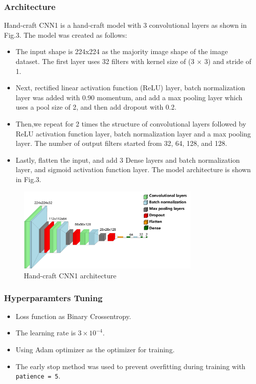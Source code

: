 \documentclass[conference]{IEEEtran}
\begin{document}
\subsubsection{Architecture}
Hand-craft CNN1 is a hand-craft model with 3 convolutional layers as shown in Fig.3. The model was created as follows:
\begin{itemize}
    \item The input shape is 224x224 as the majority image shape of the image dataset. The first layer uses 32 filters with kernel size of (3 × 3) and stride of 1.
    \item Next, rectified linear activation function (ReLU) layer, batch normalization layer was added with 0.90 momentum, and add a max pooling layer which uses a pool size of 2, and then add dropout with 0.2.
    \item Then,we repeat for 2 times the structure of convolutional layers followed by ReLU activation function layer, batch normalization layer and a max pooling layer. The number of output filters started from 32, 64, 128, and 128. 
    \item Lastly, flatten the input, and add 3 Dense layers and batch normalization layer, and sigmoid activation function layer.
    The model architecture is shown in Fig.3.
    
\end{itemize}

\begin{figure}[ht!] %
\centering
\includegraphics[width=3.5in]{CNN1.pdf}
\caption{ Hand-craft CNN1 architecture}
\label{bench}
\end{figure}

\subsubsection{Hyperparamters Tuning}
\begin{itemize}
    \item Loss function as Binary Crossentropy.
    \item The learning rate is $3\times10^{-4}$.
    \item Using Adam optimizer as the optimizer for training. 
    \item The early stop method was used to prevent overfitting during training with \texttt{patience = 5}.
\end{itemize}
\end{document}

